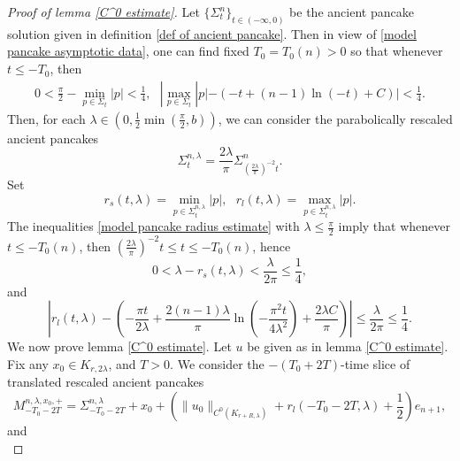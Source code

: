 \documentclass[10pt,a4paper]{amsart}
\begin{document}
\begin{proof}[Proof of lemma \ref{C^0 estimate}]
Let $\{\Sigma^n_t\}_{t\in(-\infty, 0)}$ be the ancient pancake solution given in definition \ref{def of ancient pancake}. Then in view of \eqref{model pancake asymptotic data}, one can find fixed $T_0 = T_0(n) > 0$ so that whenever $t \leq -T_0$, then
\begin{align}\label{model pancake radius estimate}
     0 < \frac{\pi}{2}- \min_{p \in \Sigma_t}|p| < \frac{1}{4} , \ \ \ |\max_{p \in \Sigma_t}|p| - (-t + (n-1)\ln(-t) + C)| < \frac{1}{4}.
\end{align}
Then, for each $\lambda \in (0,\frac{1}{2}\min(\frac{\pi}{2}, b))$, we can consider the parabolically rescaled ancient pancakes
\begin{equation}\label{definition of rescaled ancient pancakes}
    \Sigma^{n, \lambda}_t = \frac{2\lambda}{\pi} \Sigma^n_{(\frac{2\lambda}{\pi})^{-2}t}.
\end{equation}
Set 
\begin{equation}\label{def of long and short radius}
    r_s(t,\lambda) = \min_{p \in \Sigma^{n, \lambda}_t}|p|, \ \ \ r_l(t, \lambda) =  \max_{p \in \Sigma^{n, \lambda}_t}|p|.
\end{equation}
The inequalities \eqref{model pancake radius estimate} with $\lambda \leq \frac{\pi}{2}$ imply that whenever $t \leq -T_0(n)$, then $(\frac{2\lambda}{\pi})^{-2}t \leq t \leq -T_0(n)$, hence
\begin{equation}\label{short radius estimate for rescaled ancient pancakes}
    0 < \lambda - r_s(t,\lambda)   < \frac{\lambda}{2\pi} \leq \frac{1}{4},
\end{equation}
and
\begin{equation}\label{long radius estimate for rescaled ancient pancakes}
    |r_l(t, \lambda) - (-\frac{\pi t}{2\lambda}+ \frac{2(n-1)\lambda}{\pi}\ln(-\frac{\pi^2t}{4\lambda^2}) + \frac{2\lambda C}{\pi})| \leq \frac{\lambda}{2\pi} \leq \frac{1}{4}.
\end{equation}
We now prove lemma \ref{C^0 estimate}. Let $u$ be given as in lemma \ref{C^0 estimate}. Fix any $x_0 \in K_{ r, 2\lambda}$, and $T > 0$. We consider the $-(T_0 + 2T)$-time slice of translated rescaled ancient pancakes
\begin{equation}\label{def of upper barriers}
    M^{n, \lambda, x_0, +}_{-T_0 - 2T } = \Sigma^{n, \lambda}_{-T_0 -2T}  + x_0 + (\|u_0\|_{C^0(K_{ r + R, \lambda})} + r_l(-T_0-2T, \lambda) + \frac{1}{2})e_{n+1},
\end{equation}
and
\begin{equation}\label{def of lower barriers}

\end{equation}
\end{proof}
\end{document}
